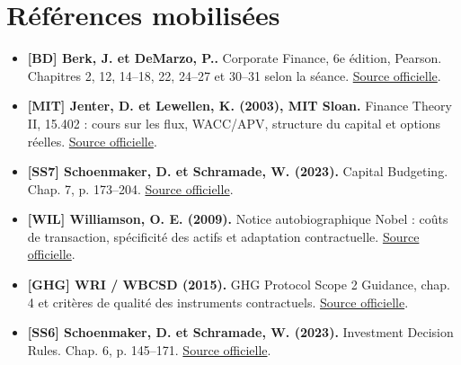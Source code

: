 \documentclass[12pt,a4paper]{article}
\begin{document}
\section*{Références mobilisées}
\small
\begin{itemize}
\item \textbf{[BD] Berk, J. et DeMarzo, P..} Corporate Finance, 6e édition, Pearson. Chapitres 2, 12, 14--18, 22, 24--27 et 30--31 selon la séance. \href{https://www.pearson.com/en-us/subject-catalog/p/corporate-finance/P200000009791/9780137844906}{Source officielle}.
\item \textbf{[MIT] Jenter, D. et Lewellen, K. (2003), MIT Sloan.} Finance Theory II, 15.402 : cours sur les flux, WACC/APV, structure du capital et options réelles. \href{https://ocw.mit.edu/courses/15-402-finance-theory-ii-spring-2003/pages/lecture-notes/}{Source officielle}.
\item \textbf{[SS7] Schoenmaker, D. et Schramade, W. (2023).} Capital Budgeting. Chap. 7, p. 173--204. \href{https://doi.org/10.1007/978-3-031-35009-2_7}{Source officielle}.
\item \textbf{[WIL] Williamson, O. E. (2009).} Notice autobiographique Nobel : coûts de transaction, spécificité des actifs et adaptation contractuelle. \href{https://www.nobelprize.org/prizes/economic-sciences/2009/williamson/biographical/}{Source officielle}.
\item \textbf{[GHG] WRI / WBCSD (2015).} GHG Protocol Scope 2 Guidance, chap. 4 et critères de qualité des instruments contractuels. \href{https://ghgprotocol.org/sites/default/files/2023-03/Scope\%202\%20Guidance.pdf}{Source officielle}.
\item \textbf{[SS6] Schoenmaker, D. et Schramade, W. (2023).} Investment Decision Rules. Chap. 6, p. 145--171. \href{https://doi.org/10.1007/978-3-031-35009-2_6}{Source officielle}.
\end{itemize}\normalsize
\end{document}
